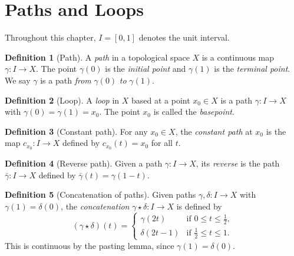 \documentclass[12pt,a4paper,openany]{book}
\theoremstyle{definition}
\newtheorem{definition}{Definition}[chapter]
\theoremstyle{plain}
\theoremstyle{remark}
\begin{document}
\section{Paths and Loops}\label{sec:paths-loops}

Throughout this chapter, $I = [0,1]$ denotes the unit interval.

\begin{definition}[Path]\label{def:path}
A \emph{path} in a topological space $X$ is a continuous map
$\gamma \colon I \to X$. The point $\gamma(0)$ is the \emph{initial point} and
$\gamma(1)$ is the \emph{terminal point}. We say $\gamma$ is a path \emph{from}
$\gamma(0)$ \emph{to} $\gamma(1)$.
\end{definition}

\begin{definition}[Loop]\label{def:loop}
A \emph{loop} in $X$ based at a point $x_0 \in X$ is a path
$\gamma \colon I \to X$ with $\gamma(0) = \gamma(1) = x_0$. The point $x_0$ is
called the \emph{basepoint}.
\end{definition}

\begin{definition}[Constant path]\label{def:constant-path}
For any $x_0 \in X$, the \emph{constant path} at $x_0$ is the map $c_{x_0}
\colon I \to X$ defined by $c_{x_0}(t) = x_0$ for all $t$.
\end{definition}

\begin{definition}[Reverse path]\label{def:reverse-path}
Given a path $\gamma \colon I \to X$, its \emph{reverse} is
the path $\bar{\gamma} \colon I \to X$ defined by $\bar{\gamma}(t) =
\gamma(1-t)$.
\end{definition}

\begin{definition}[Concatenation of paths]\label{def:concatenation}
Given paths $\gamma, \delta \colon I \to X$ with $\gamma(1) = \delta(0)$, the
\emph{concatenation} $\gamma \star \delta \colon I
\to X$ is defined by
\[
  (\gamma \star \delta)(t) = \begin{cases}
    \gamma(2t) & \text{if } 0 \le t \le \tfrac{1}{2}, \\
    \delta(2t - 1) & \text{if } \tfrac{1}{2} \le t \le 1.
  \end{cases}
\]
This is continuous by the pasting lemma, since $\gamma(1) = \delta(0)$.
\end{definition}
\end{document}
